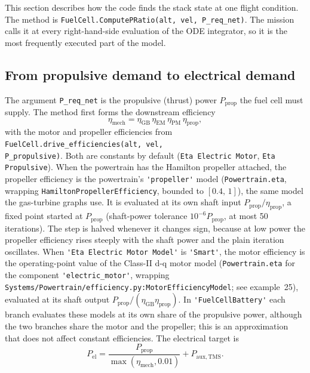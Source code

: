 \documentclass[a4paper,11pt]{article}
\newcommand{\code}[1]{\nolinkurl{#1}}
\newcommand{\fn}[1]{\nolinkurl{#1}}
\newcommand{\Pel}{P_\mathrm{el}}
\begin{document}
This section describes how the code finds the stack state at one flight condition. The method
is \fn{FuelCell.ComputePRatio(alt, vel, P_req_net)}. The
mission calls it at every right-hand-side evaluation of the ODE integrator, so it is the most
frequently executed part of the model.

\subsection{From propulsive demand to electrical demand}

The argument \code{P_req_net} is the propulsive (thrust) power $P_\mathrm{prop}$ the fuel
cell must supply. The method first forms the downstream efficiency
\begin{equation}
  \eta_\mathrm{mech} = \eta_\mathrm{GB}\,\eta_\mathrm{EM}\,\eta_\mathrm{PM}\,\eta_\mathrm{prop},
\end{equation}
with the motor and propeller efficiencies from \fn{FuelCell.drive_efficiencies(alt, vel,
P_propulsive)}. Both are constants by default (\code{Eta Electric Motor}, \code{Eta
Propulsive}). When the powertrain has the Hamilton propeller attached, the propeller
efficiency is the powertrain's \code{'propeller'} model (\fn{Powertrain.eta}, wrapping
\fn{HamiltonPropellerEfficiency}, bounded to $[0.4,\,1]$), the same model the gas-turbine
graphs use. It is evaluated at its own shaft input $P_\mathrm{prop}/\eta_\mathrm{prop}$, a
fixed point started at $P_\mathrm{prop}$ (shaft-power tolerance $10^{-6}P_\mathrm{prop}$, at
most 50 iterations). The step is halved whenever it changes sign, because at low power the
propeller efficiency rises steeply with the shaft power and the plain iteration oscillates. When
\code{'Eta Electric Motor Model'} is \code{'Smart'}, the motor efficiency is the operating-point
value of the Class-II d-q motor model (\fn{Powertrain.eta} for the component
\code{'electric_motor'}, wrapping \fn{Systems/Powertrain/efficiency.py:MotorEfficiencyModel};
see example~25), evaluated at its shaft output $P_\mathrm{prop}/(\eta_\mathrm{GB}\eta_\mathrm{prop})$.
In \code{'FuelCellBattery'} each branch evaluates these models at its own share of the
propulsive power, although the two branches share the motor and the propeller; this is an
approximation that does not affect constant efficiencies. The electrical target is
\begin{equation}
  \Pel = \frac{P_\mathrm{prop}}{\max(\eta_\mathrm{mech},0.01)} + P_\mathrm{aux,TMS}.
\end{equation}
\end{document}
